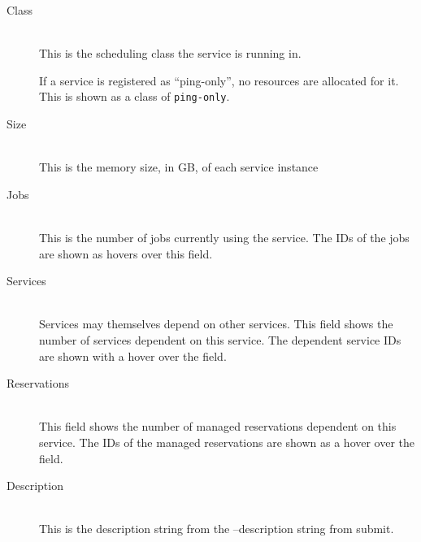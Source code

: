 \begin{description}
            \item[Class] \hfill \\
              This is the scheduling class the service is running in. 
              
              If a service is registered as ``ping-only'', no resources are allocated for it.  This
              is shown as a class of {\tt ping-only}.
              
            \item[Size] \hfill \\
              This is the memory size, in GB, of each service instance

            \item[Jobs] \hfill \\
              This is the number of jobs currently using the service.  The IDs of the jobs are
              shown as hovers over this field.

            \item[Services] \hfill \\
              Services may themselves depend on other services.  This field shows the number of
              services dependent on this service.  The dependent service IDs are shown with a 
              hover over the field.

            \item[Reservations] \hfill \\
              This field shows the number of
              managed reservations dependent on this service. The IDs of the managed reservations
              are shown as a hover over the field.

              
            \item[Description] \hfill \\
              This is the description string from the --description string from submit.
        \end{description}
